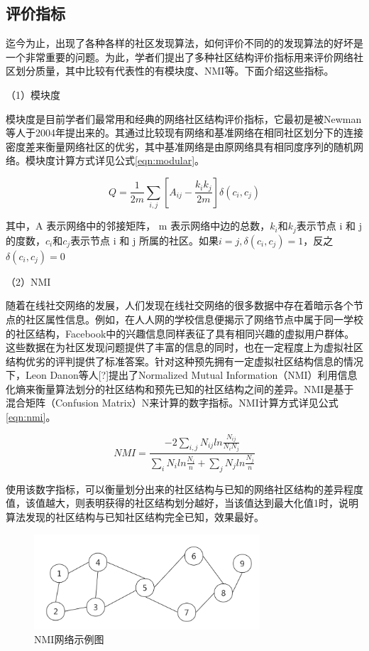 \subsection{评价指标}
迄今为止，出现了各种各样的社区发现算法，如何评价不同的的发现算法的好坏是一个非常重要的问题。为此，学者们提出了多种社区结构评价指标用来评价网络社区划分质量，其中比较有代表性的有模块度、NMI等。下面介绍这些指标。

（1）模块度

模块度是目前学者们最常用和经典的网络社区结构评价指标，它最初是被Newman等人于2004年提出来的\cite{2002Community}。其通过比较现有网络和基准网络在相同社区划分下的连接密度差来衡量网络社区的优劣，其中基准网络是由原网络具有相同度序列的随机网络。模块度计算方式详见公式\ref{eqn:modular}。

\begin{equation}
  \label{eqn:modular}
  Q=\frac{1}{2m}\sum_{i,j}\left [ A_{ij}-\frac{k_ik_j}{2m} \right ]\delta (c_i, c_j)  
\end{equation}

其中，A 表示网络中的邻接矩阵， m 表示网络中边的总数，$k_i$和$k_j$表示节点 i 和 j 的度数，$c_i$和$c_j$表示节点 i 和 j 所属的社区。如果$i=j,\delta(c_i,c_j)=1$，反之$\delta(c_i,c_j)=0$

（2）NMI

随着在线社交网络的发展，人们发现在线社交网络的很多数据中存在着暗示各个节点的社区属性信息。例如，在人人网的学校信息便揭示了网络节点中属于同一学校的社区结构，Facebook中的兴趣信息同样表征了具有相同兴趣的虚拟用户群体。这些数据在为社区发现问题提供了丰富的信息的同时，也在一定程度上为虚拟社区结构优劣的评判提供了标准答案。针对这种预先拥有一定虚拟社区结构信息的情况下，Leon Danon等人[?]提出了Normalized Mutual Information（NMI）利用信息化熵来衡量算法划分的社区结构和预先已知的社区结构之间的差异。NMI是基于混合矩阵（Confusion Matrix）N来计算的数字指标。NMI计算方式详见公式\ref{eqn:nmi}。

\begin{equation}
  \label{eqn:nmi}
  NMI=\frac{ -2 \sum_{i,j} N_{ij}  ln{\frac{N_{ij}}{N_iN_j}} } {\sum_{i}N_iln{\frac{N_i}{n}}+\sum_{j}N_jln{\frac{N_j}{n}}}
\end{equation}

使用该数字指标，可以衡量划分出来的社区结构与已知的网络社区结构的差异程度值，该值越大，则表明获得的社区结构划分越好，当该值达到最大化值1时，说明算法发现的社区结构与已知社区结构完全已知，效果最好。

\begin{figure}
 \centering
 \includegraphics[width=0.75\textwidth]{figures/fig5-1}
 \caption{NMI网络示例图}\label{fig:fig5-1}
\end{figure}

